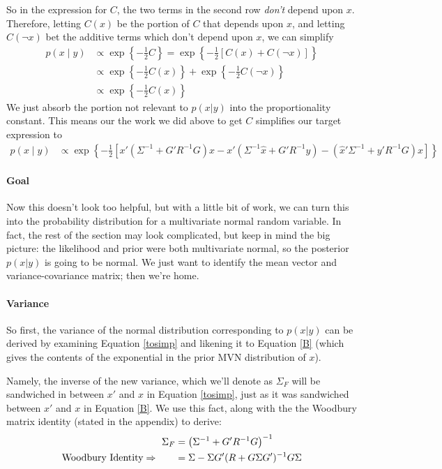 \documentclass[a4paper,12pt]{article}
\begin{document}
So in the expression for $C$, the two terms
in the second row \emph{don't} depend upon $x$. Therefore,
letting $C(x)$ be the portion of $C$ that depends upon
$x$, and letting $C(\lnot x)$ bet the additive terms which
don't depend upon $x$, we can simplify
\begin{align*}
    p(x\; | \; y) &\propto \exp\left\{ -\frac{1}{2}
	C \right\} = \exp\left\{ -\frac{1}{2}
	\left[C(x) + C(\lnot x) \right]\right\}  \\
    &\propto \exp\left\{ -\frac{1}{2}
	C(x)\right\} +  \exp\left\{ -\frac{1}{2} C(\lnot x) 
	\right\}  \\
    &\propto \exp\left\{ -\frac{1}{2}
	C(x)\right\}
\end{align*}
We just absorb the portion not relevant to $p(x|y)$ into
the proportionality constant.  This means our the work we
did above to get $C$ simplifies our target expression to
\begin{align}
    p(x\;|\;y) &\propto \exp\left\{-\frac{1}{2} \left[
	x' \left( \Sigma^{-1} + G'R^{-1}G\right) x 
	- x' (\Sigma^{-1} \hat{x} + G'R^{-1}y)
	- (\hat{x}' \Sigma^{-1} + y' R^{-1}G) x  \right]\right\}
	\label{tosimp}
\end{align}
\paragraph{Goal}
Now this doesn't look too helpful, but with a little bit of 
work, we can turn this into the probability distribution
for a multivariate normal random variable. 
In fact, the rest of the section may look complicated, but
keep in mind the big picture: the likelihood and prior
were both multivariate normal, so 
the posterior $p(x|y)$ is going to be normal. We just want
to identify the mean vector and variance-covariance matrix;
then we're home.

\paragraph{Variance} So first, the {variance} of the 
normal distribution corresponding to $p(x|y)$ can
be derived by examining Equation \ref{tosimp} and likening
it to Equation \ref{B} (which gives the contents of the 
exponential in the prior MVN distribution of $x$).  

Namely, the inverse of the new variance,
which we'll denote as $\Sigma_F$ will be sandwiched in 
between $x'$ and $x$ in Equation \ref{tosimp}, just as it 
was sandwiched between $x'$ and $x$ in Equation \ref{B}.
We use this fact, along with the 
the Woodbury matrix identity (stated in 
the appendix) to derive:
\begin{align}
    \Sigma_{F} &= \left( \Sigma^{-1} + G'R^{-1}G\right)^{-1} 
	\notag \\
    \text{Woodbury Identity} \Rightarrow
	\qquad &=  \Sigma - \Sigma G'(R 
	    + G\Sigma G')^{-1}
	    G\Sigma
	    \label{covar}
\end{align}
\end{document}
